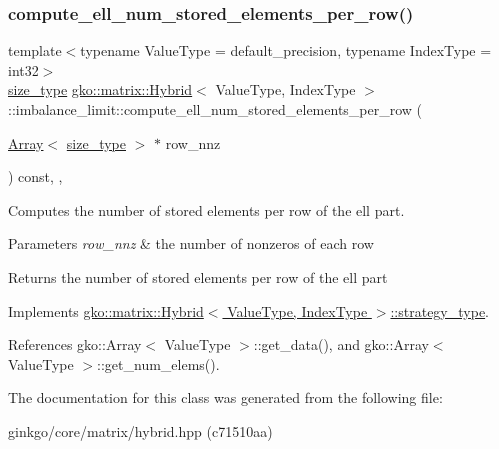 \subsubsection{\texorpdfstring{compute\+\_\+ell\+\_\+num\+\_\+stored\+\_\+elements\+\_\+per\+\_\+row()}{compute\_ell\_num\_stored\_elements\_per\_row()}}
{\footnotesize\ttfamily template$<$typename Value\+Type = default\+\_\+precision, typename Index\+Type = int32$>$ \\
\hyperlink{namespacegko_a6e5c95df0ae4e47aab2f604a22d98ee7}{size\+\_\+type} \hyperlink{classgko_1_1matrix_1_1Hybrid}{gko\+::matrix\+::\+Hybrid}$<$ Value\+Type, Index\+Type $>$\+::imbalance\+\_\+limit\+::compute\+\_\+ell\+\_\+num\+\_\+stored\+\_\+elements\+\_\+per\+\_\+row (\begin{DoxyParamCaption}\item[{\hyperlink{classgko_1_1Array}{Array}$<$ \hyperlink{namespacegko_a6e5c95df0ae4e47aab2f604a22d98ee7}{size\+\_\+type} $>$ $\ast$}]{row\+\_\+nnz }\end{DoxyParamCaption}) const\hspace{0.3cm}{\ttfamily [inline]}, {\ttfamily [override]}, {\ttfamily [virtual]}}



Computes the number of stored elements per row of the ell part. 


\begin{DoxyParams}{Parameters}
{\em row\+\_\+nnz} & the number of nonzeros of each row\\
\hline
\end{DoxyParams}
\begin{DoxyReturn}{Returns}
the number of stored elements per row of the ell part 
\end{DoxyReturn}


Implements \hyperlink{classgko_1_1matrix_1_1Hybrid_1_1strategy__type_a0a0cd4024f27c7d0f286f35fc0a6de60}{gko\+::matrix\+::\+Hybrid$<$ Value\+Type, Index\+Type $>$\+::strategy\+\_\+type}.



References gko\+::\+Array$<$ Value\+Type $>$\+::get\+\_\+data(), and gko\+::\+Array$<$ Value\+Type $>$\+::get\+\_\+num\+\_\+elems().



The documentation for this class was generated from the following file\+:\begin{DoxyCompactItemize}
\item 
ginkgo/core/matrix/hybrid.\+hpp (c71510aa)\end{DoxyCompactItemize}
